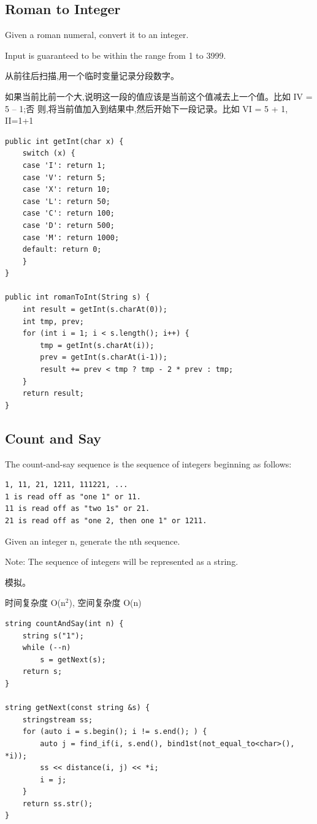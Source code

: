 \documentclass[12pt]{book}
\begin{document}
\subsection{Roman to Integer}
\label{sec-2-1-6}
Given a roman numeral, convert it to an integer.

Input is guaranteed to be within the range from 1 to 3999.

从前往后扫描,用一个临时变量记录分段数字。

如果当前比前一个大,说明这一段的值应该是当前这个值减去上一个值。比如 IV = 5 – 1;否
则,将当前值加入到结果中,然后开始下一段记录。比如 VI = 5 + 1, II=1+1

\lstset{language=java,label= ,caption= ,numbers=none}
\begin{lstlisting}
public int getInt(char x) {
    switch (x) {
    case 'I': return 1;
    case 'V': return 5;
    case 'X': return 10;
    case 'L': return 50;
    case 'C': return 100;
    case 'D': return 500;
    case 'M': return 1000;
    default: return 0;
    }
}

public int romanToInt(String s) {
    int result = getInt(s.charAt(0));
    int tmp, prev;
    for (int i = 1; i < s.length(); i++) {
        tmp = getInt(s.charAt(i));
        prev = getInt(s.charAt(i-1));
        result += prev < tmp ? tmp - 2 * prev : tmp;
    }
    return result;
}
\end{lstlisting}

\subsection{Count and Say}
\label{sec-2-1-7}
The count-and-say sequence is the sequence of integers beginning as
follows:
\lstset{language=java,label= ,caption= ,numbers=none}
\begin{lstlisting}
1, 11, 21, 1211, 111221, ...
1 is read off as "one 1" or 11.
11 is read off as "two 1s" or 21.
21 is read off as "one 2, then one 1" or 1211.
\end{lstlisting}

Given an integer n, generate the nth sequence.

Note: The sequence of integers will be represented as a string.

模拟。

时间复杂度 O(n$^{\text{2}}$), 空间复杂度 O(n)

\lstset{language=java,label= ,caption= ,numbers=none}
\begin{lstlisting}
string countAndSay(int n) {
    string s("1");
    while (--n)
        s = getNext(s);
    return s;
}

string getNext(const string &s) {
    stringstream ss;
    for (auto i = s.begin(); i != s.end(); ) {
        auto j = find_if(i, s.end(), bind1st(not_equal_to<char>(), *i));
        ss << distance(i, j) << *i;
        i = j;
    }
    return ss.str();
}
\end{lstlisting}
\end{document}
